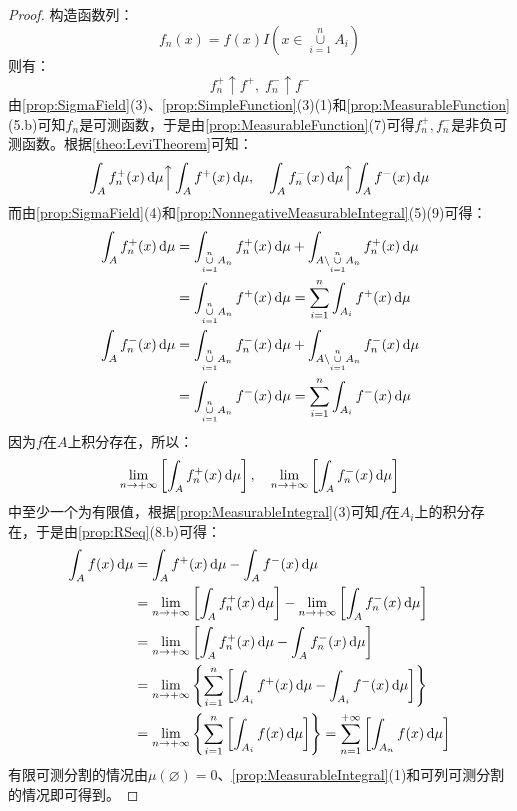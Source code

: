 \begin{proof}
	构造函数列：
	\begin{equation*}
		f_n(x)=f(x)I\left(x\in\underset{i=1}{\overset{n}{\cup}}A_i\right)
	\end{equation*}
	则有：
	\begin{equation*}
		f_n^+\uparrow f^+,\;f_n^-\uparrow f^-
	\end{equation*}
	由\cref{prop:SigmaField}(3)、\cref{prop:SimpleFunction}(3)(1)和\cref{prop:MeasurableFunction}(5.b)可知$f_n$是可测函数，于是由\cref{prop:MeasurableFunction}(7)可得$f_n^+,f_n^-$是非负可测函数。根据\cref{theo:LeviTheorem}可知：
	\begin{equation*}
		\int_{A}f_n^+(x)\mathop{}\!\mathrm{d}\mu\Big\uparrow\int_{A}f^+(x)\mathop{}\!\mathrm{d}\mu,\quad\int_{A}f_n^-(x)\mathop{}\!\mathrm{d}\mu\Big\uparrow\int_{A}f^-(x)\mathop{}\!\mathrm{d}\mu
	\end{equation*}
	而由\cref{prop:SigmaField}(4)和\cref{prop:NonnegativeMeasurableIntegral}(5)(9)可得：
	\begin{gather*}
		\begin{aligned}
			\int_{A}f_n^+(x)\dif\mu
			&=\int_{\underset{i=1}{\overset{n}{\cup}}A_n}f_n^+(x)\dif\mu+\int_{A\setminus\underset{i=1}{\overset{n}{\cup}}A_n}f_n^+(x)\dif\mu \\
			&=\int_{\underset{i=1}{\overset{n}{\cup}}A_n}f^+(x)\dif\mu
			=\sum_{i=1}^{n}\int_{A_i}f^+(x)\dif\mu
		\end{aligned} \\
		\begin{aligned}
			\int_{A}f_n^-(x)\dif\mu
			&=\int_{\underset{i=1}{\overset{n}{\cup}}A_n}f_n^-(x)\dif\mu+\int_{A\setminus\underset{i=1}{\overset{n}{\cup}}A_n}f_n^-(x)\dif\mu \\
			&=\int_{\underset{i=1}{\overset{n}{\cup}}A_n}f^-(x)\dif\mu
			=\sum_{i=1}^{n}\int_{A_i}f^-(x)\dif\mu
		\end{aligned} 
	\end{gather*}
	因为$f$在$A$上积分存在，所以：
	\begin{equation*}
		\lim_{n\to+\infty}\left[\int_{A}f_n^+(x)\mathop{}\!\mathrm{d}\mu\right],\quad\lim_{n\to+\infty}\left[\int_{A}f_n^-(x)\mathop{}\!\mathrm{d}\mu\right]
	\end{equation*}
	中至少一个为有限值，根据\cref{prop:MeasurableIntegral}(3)可知$f$在$A_i$上的积分存在，于是由\cref{prop:RSeq}(8.b)可得：
	\begin{align*}
		\int_{A}f(x)\dif\mu&=\int_{A}f^+(x)\dif\mu-\int_{A}f^-(x)\dif\mu \\
		&=\lim_{n\to+\infty}\left[\int_{A}f_n^+(x)\dif\mu\right]-\lim_{n\to+\infty}\left[\int_{A}f_n^-(x)\dif\mu\right] \\
		&=\lim_{n\to+\infty}\left[\int_{A}f_n^+(x)\dif\mu-\int_{A}f_n^-(x)\dif\mu\right] \\
		&=\lim_{n\to+\infty}\left\{\sum_{i=1}^{n}\left[\int_{A_i}f^+(x)\dif\mu-\int_{A_i}f^-(x)\dif\mu\right]\right\} \\
		&=\lim_{n\to+\infty}\left\{\sum_{i=1}^{n}\left[\int_{A_i}f(x)\dif\mu\right]\right\}=\sum_{n=1}^{+\infty}\left[\int_{A_n}f(x)\dif\mu\right]
	\end{align*}
	有限可测分割的情况由$\mu(\varnothing)=0$、\cref{prop:MeasurableIntegral}(1)和可列可测分割的情况即可得到。
\end{proof}
